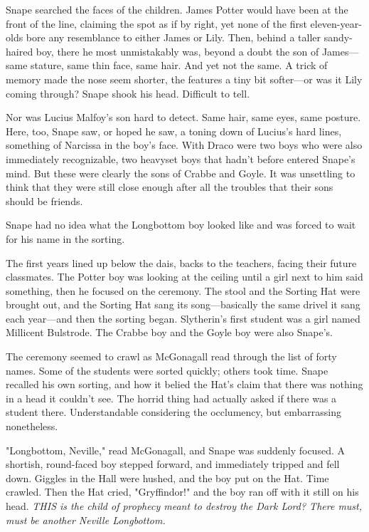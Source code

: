 Snape searched the faces of the children. James Potter would have been at the front of the line, claiming the spot as if by right, yet none of the first eleven-year-olds bore any resemblance to either James or Lily. Then, behind a taller sandy-haired boy, there he most unmistakably was, beyond a doubt the son of James—same stature, same thin face, same hair. And yet not the same. A trick of memory made the nose seem shorter, the features a tiny bit softer—or was it Lily coming through? Snape shook his head. Difficult to tell.

Nor was Lucius Malfoy's son hard to detect. Same hair, same eyes, same posture. Here, too, Snape saw, or hoped he saw, a toning down of Lucius's hard lines, something of Narcissa in the boy's face. With Draco were two boys who were also immediately recognizable, two heavyset boys that hadn't before entered Snape's mind. But these were clearly the sons of Crabbe and Goyle. It was unsettling to think that they were still close enough after all the troubles that their sons should be friends.

Snape had no idea what the Longbottom boy looked like and was forced to wait for his name in the sorting.

The first years lined up below the dais, backs to the teachers, facing their future classmates. The Potter boy was looking at the ceiling until a girl next to him said something, then he focused on the ceremony. The stool and the Sorting Hat were brought out, and the Sorting Hat sang its song—basically the same drivel it sang each year—and then the sorting began. Slytherin's first student was a girl named Millicent Bulstrode. The Crabbe boy and the Goyle boy were also Snape's.

The ceremony seemed to crawl as McGonagall read through the list of forty names. Some of the students were sorted quickly; others took time. Snape recalled his own sorting, and how it belied the Hat's claim that there was nothing in a head it couldn't see. The horrid thing had actually asked if there was a student there. Understandable considering the occlumency, but embarrassing nonetheless.

"Longbottom, Neville," read McGonagall, and Snape was suddenly focused. A shortish, round-faced boy stepped forward, and immediately tripped and fell down. Giggles in the Hall were hushed, and the boy put on the Hat. Time crawled. Then the Hat cried, "Gryffindor!" and the boy ran off with it still on his head. \emph{THIS is the child of prophecy meant to destroy the Dark Lord? There must, must be another Neville Longbottom.}

